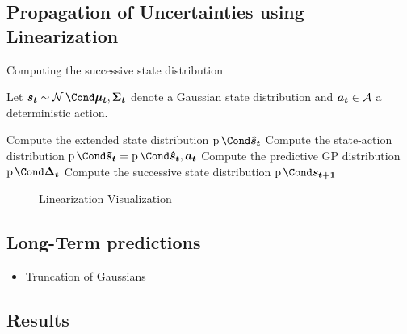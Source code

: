 \subsection{Propagation of Uncertainties using Linearization}
\begin{algorithm}[tp]
    \caption{Computing the successive state distribution}
    \label{alg:successive_distribution}
    Let $\rv{s_t} \sim \Gaussian{\mat{\mu_t}, \mat{\Sigma_t}}$ denote a Gaussian state distribution and $\bm{a_t} \in \mathcal{A}$ a deterministic action.
    \begin{algorithmic}[1]
        \State Compute the extended state distribution $\Prob{\rv{\hat{s}_t}}$
        \State Compute the state-action distribution $\Prob{\rv{\tilde{s}_t}} = \Prob{\rv{\hat{s}_t}, \mat{a_t}}$
        \State Compute the predictive GP distribution $\Prob{\rv{\Delta_t}}$
        \State Compute the successive state distribution $\Prob{\rv{s_{t+1}}}$
    \end{algorithmic}
\end{algorithm}
\begin{figure}[p]
    \centering
    \caption{Linearization Visualization}
    \label{fig:linearization}
\end{figure}

\subsection{Long-Term predictions}
\begin{itemize}
    \item Truncation of Gaussians
\end{itemize}

\subsection{Results}
